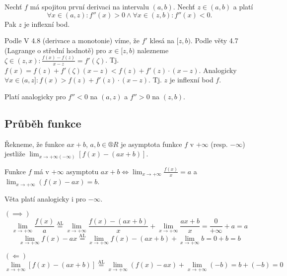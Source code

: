 \documentclass[12pt]{article}					%
\begin{document}

        \begin{veta}
            Nechť $f$ má spojitou první derivaci na intervalu $(a, b)$. Nechť $z \in (a, b)$ a platí
            $$ \forall x \in (a, z): f''(x)>0 \land \forall x \in (z, b): f''(x)<0. $$ 
            Pak $z$ je inflexní bod.

            \begin{dukazin}
                Podle V 4.8 (derivace a monotonie) víme, že $f'$ klesá na $[z, b)$. Podle věty 4.7 (Lagrange o střední hodnotě) pro $x \in [z, b)$ nalezneme $\zeta \in (z, x): \frac{f(x) - f(z)}{x - z} = f'(\zeta)$. Tj. $f(x) = f(z) + f'(\zeta)(x-z) < f(z) + f'(z)·(x-z)$. Analogicky $\forall x \in (a, z]: f(x) > f(z) + f'(z)·(x-z)$. Tj. $z$ je inflexní bod $f$.
            \end{dukazin}

            \begin{poznamkain}
                Platí analogicky pro  $f'' < 0$ na $(a, z)$ a $f'' > 0$ na $(z, b)$.
            \end{poznamkain}
        \end{veta}

    \subsection{Průběh funkce}

        \begin{definice}
            Řekneme, že funkce $ax + b$, $a, b \in ®R$ je asymptota funkce $f$ v $+∞$ (resp. $-∞$) jestliže $\lim_{x \rightarrow +∞ (-∞)} [f(x) - (ax+b)]$.
        \end{definice}

        \begin{veta}
            Funkce $f$ má v $+∞$ asymptotu $ax + b \Leftrightarrow \lim_{x \rightarrow +∞} \frac{f(x)}{x} = a$ a $\lim_{x \rightarrow +∞} (f(x) - ax) = b$.

            \begin{poznamkain}
                Věta platí analogicky i pro $-∞$.
            \end{poznamkain}

            \begin{dukazin}
                $(\implies)$
                $$ \lim_{x \rightarrow +∞} \frac{f(x)}{a} \overset{\text{AL}}{=} \lim_{x \rightarrow +∞} \frac{f(x) - (ax + b)}{x} + \lim_{x \rightarrow +∞} \frac{ax + b}{x} = \frac{0}{+∞} + a = a $$
                $$ \lim_{x \rightarrow +∞} f(x) - ax \overset{\text{AL}}{=} \lim_{x \rightarrow +∞} f(x) - (ax + b) + \lim_{x \rightarrow +∞} b = 0 + b = b $$

                $(\Leftarrow)$
                $$ \lim_{x \rightarrow +∞} [f(x) - (ax + b)] \overset{\text{AL}}{=} \lim_{x \rightarrow +∞} (f(x) - ax) + \lim_{x \rightarrow +∞} (-b) = b + (-b) = 0 $$ 
            \end{dukazin}
        \end{veta}
\end{document}
